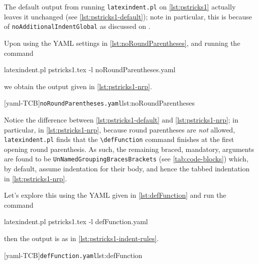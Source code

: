 	The default output from running \texttt{latexindent.pl} on \cref{lst:pstricks1} actually leaves it unchanged (see \cref{lst:pstricks1-default});
	note in particular, this is because of \texttt{noAdditionalIndentGlobal} as discussed on .

	Upon using the YAML settings in \cref{lst:noRoundParentheses}, and running the command
	\begin{commandshell}
latexindent.pl pstricks1.tex -l noRoundParentheses.yaml
        \end{commandshell}
	we obtain the output given in  \cref{lst:pstricks1-nrp}.

	\begin{minipage}{.45\textwidth}
	\end{minipage}
	\hfill
	\begin{minipage}{.45\textwidth}
		[yaml-TCB]{\texttt{noRoundParentheses.yaml}}{lst:noRoundParentheses}
	\end{minipage}

	Notice the difference between \cref{lst:pstricks1-default} and \cref{lst:pstricks1-nrp}; in particular, in \cref{lst:pstricks1-nrp}, because
	round parentheses are \emph{not} allowed, \texttt{latexindent.pl} finds that the \lstinline!\defFunction! command finishes at the first opening
	round parenthesis. As such, the remaining braced, mandatory, arguments are found to be \texttt{UnNamedGroupingBracesBrackets} (see \vref{tab:code-blocks})
	which, by default, assume indentation for their body, and hence the tabbed indentation in \cref{lst:pstricks1-nrp}.

	Let's explore this using the YAML given in \cref{lst:defFunction} and run the command
	\begin{commandshell}
latexindent.pl pstricks1.tex -l defFunction.yaml
        \end{commandshell}
	then the output is as in \cref{lst:pstricks1-indent-rules}.

	\begin{minipage}{.45\textwidth}
	\end{minipage}
	\hfill
	\begin{minipage}{.45\textwidth}
		[yaml-TCB]{\texttt{defFunction.yaml}}{lst:defFunction}
	\end{minipage}

